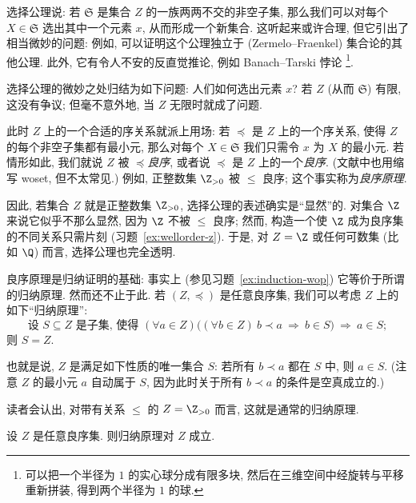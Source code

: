 \noindent 选择公理说: 若 $\mathfrak{S}$ 是集合 $Z$ 的一族两两不交的非空子集, 那么我们可以对每个 $X\in\mathfrak{S}$ 选出其中一个元素 $x$, 从而形成一个新集合. 这听起来或许合理, 但它引出了相当微妙的问题: 例如, 可以证明这个公理独立于 (Zermelo--Fraenkel) 集合论的其他公理. 此外, 它有令人不安的反直觉推论, 例如 Banach--Tarski 悖论%
\footnote{可以把一个半径为 $1$ 的实心球分成有限多块, 然后在三维空间中经旋转与平移重新拼装, 得到两个半径为 $1$ 的球.}.

\noindent 选择公理的微妙之处归结为如下问题: 人们如何选出元素 $x$? 若 $Z$ (从而 $\mathfrak{S}$) 有限, 这没有争议; 但毫不意外地, 当 $Z$ 无限时就成了问题.

\noindent 此时 $Z$ 上的一个合适的序关系就派上用场: 若 $\preceq$ 是 $Z$ 上的一个序关系, 使得 $Z$ 的每个非空子集都有最小元, 那么对每个 $X\in\mathfrak{S}$ 我们只需令 $x$ 为 $X$ 的最小元. 若情形如此, 我们就说 $Z$ 被 $\preceq$\emph{良序}, 或者说 $\preceq$ 是 $Z$ 上的一个\emph{良序}. (文献中也用缩写 woset, 但不太常见.) 例如, 正整数集 $\Z_{>0}$ 被 $\le$ 良序; 这个事实称为\emph{良序原理}.

\noindent 因此, 若集合 $Z$ 就是正整数集 $\Z_{>0}$, 选择公理的表述确实是``显然''的. 对集合 $\Z$ 来说它似乎不那么显然, 因为 $\Z$ 不被 $\le$ 良序; 然而, 构造一个使 $\Z$ 成为良序集的不同关系只需片刻 (习题~\ref{ex:wellorder-z}). 于是, 对 $Z=\Z$ 或任何可数集 (比如 $\Q$) 而言, 选择公理也完全透明.

\noindent 良序原理是归纳证明的基础: 事实上 (参见习题~\ref{ex:induction-wop}) 它等价于所谓的归纳原理. 然而还不止于此. 若 $(Z,\preceq)$ 是任意良序集, 我们可以考虑 $Z$ 上的如下``归纳原理'':
\[
\text{设 } S\subseteq Z \text{ 是子集, 使得 } (\forall a\in Z)\Big((\forall b\in Z)\ b\prec a\ \Longrightarrow\ b\in S\Big)\ \Longrightarrow\ a\in S;
\]
则 $S=Z$.

\noindent 也就是说, $Z$ 是满足如下性质的唯一集合 $S$: 若所有 $b\prec a$ 都在 $S$ 中, 则 $a\in S$. (注意 $Z$ 的最小元 $a$ 自动属于 $S$, 因为此时关于所有 $b\prec a$ 的条件是空真成立的.)

\noindent 读者会认出, 对带有关系 $\le$ 的 $Z=\Z_{>0}$ 而言, 这就是通常的归纳原理.

\begin{claim}\label{claim:induction-woset}
设 $Z$ 是任意良序集. 则归纳原理对 $Z$ 成立.
\end{claim}

